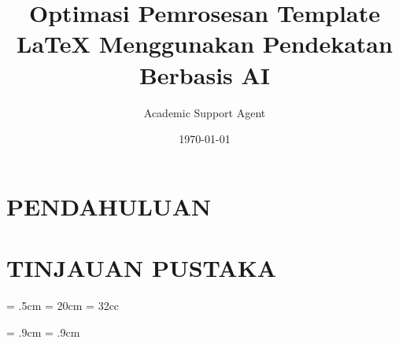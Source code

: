 \documentclass{amsart}
\title{Optimasi Pemrosesan Template LaTeX Menggunakan Pendekatan Berbasis AI}
\author{Academic Support Agent}
\date{\today}
\begin{document}
\maketitle

\begin{abstract}

\end{abstract}

\chapter{PENDAHULUAN}


\chapter{TINJAUAN PUSTAKA}


\usepackage{graphicx}
\baselineskip=16pt

\usepackage{indentfirst,csquotes}

\topmargin= .5cm
\textheight= 20cm
\textwidth= 32cc
\baselineskip=16pt

\evensidemargin= .9cm
\oddsidemargin= .9cm

\usepackage{amssymb,amsthm,amsmath}
\usepackage{xcolor,paralist,hyperref,titlesec,fancyhdr,etoolbox}
\newtheorem{theorem}{Theorem}[]
\newtheorem{definition}[theorem]{Definition}
\newtheorem{example}[theorem]{Example}
\newtheorem{lemma}[theorem]{Lemma}
\newtheorem{proposition}[theorem]{Proposition}
\newtheorem{corollary}[theorem]{Corollary}
\newtheorem{conjecture}[theorem]{Conjecture}

\titleformat{\section}[display]{\normalfont\huge\bfseries\centering}{\centering\chaptertitlename\thechapter}{10pt}{\Large}
\titlespacing*{\section}{0pt}{0ex}{0ex}

\hypersetup{ colorlinks=true, linkcolor=black, filecolor=black, urlcolor=black }
\def\proof{\noindent {\it Proof. $\, $}}
\def\endproof{\hfill $\Box$ \vskip 5 pt }

\usepackage{lipsum}
\end{document}
